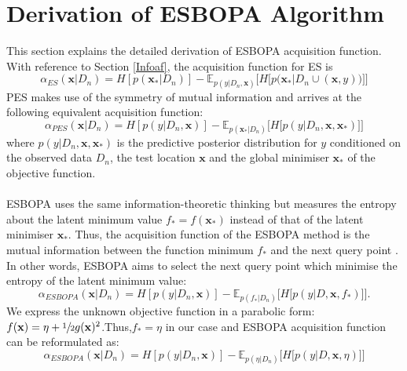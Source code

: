 \documentclass[a4paper,11pt]{report}
\begin{document}
\section{Derivation of ESBOPA Algorithm}
This section explains the detailed derivation of ESBOPA acquisition function. With reference to Section \ref{Infoaf}, the acquisition function for ES is
	\begin{equation}
	\alpha_{ES} (\mathbf{x} \vert D_n )=H[p(\mathbf{x}_{*} \vert D_n)]-\mathbb{E} _{p(y \vert D_n,\mathbf{x})}\Big[H \big[p \big(\mathbf{x}_{*} \vert D_n \cup {(\mathbf{x},y)} \big) \big] \Big]
	\end{equation}
PES makes use of the symmetry of mutual information and arrives at the following equivalent acquisition function:			 	 
	\begin{equation} 
	\alpha_{PES} (\mathbf{x} \vert D_n )=H[p(y \vert D_n,\mathbf{x})]-\mathbb{E} _{p(\mathbf{x}_{*} \vert D_n)}\Big[H \big[p(y \vert D_n,\mathbf{x},\mathbf{x}_{*}) \big] \Big]
	\end{equation}
where $p(y \vert D_n, \mathbf{x}, \mathbf{x}_{*})$ is the predictive posterior distribution for $y$ conditioned on the observed data $D_n$, the test location $\mathbf{x}$ and the global minimiser $ \mathbf{x}_{*}$ of the objective function.       
\\\\ 
ESBOPA uses the same information-theoretic thinking but measures the entropy about the latent minimum value $f_{*}=f(\mathbf{x}_{*})$ instead of that of the latent minimiser $\mathbf{x}_{*}$. Thus, the acquisition function of the ESBOPA method is the mutual information between the function minimum $f_{*}$ and the next query point \cite{wang2017max}. In other words, ESBOPA aims to select the next query point which minimise the entropy of the latent minimum value: 
	\begin{equation}
	\alpha_{ESBOPA}(\mathbf{x} \vert D_n ) = H[p(y \vert D_n,\mathbf{x})]- \mathbb{E} _{p(f_{*} \vert D_n)}\Big[H \big[p(y \vert D,\mathbf{x},f_{*})\big]\Big]. 
	\end{equation}        
We express the unknown objective function in a parabolic form: $f(\mathbf{x}) =\eta+\sfrac{1}{2}g(\mathbf{x})^2$.Thus,$f_{*} = \eta $ in our case and ESBOPA acquisition function can be reformulated as: 
   	\begin{equation}
	\alpha_{ESBOPA}(\mathbf{x} \vert D_n ) = H[p(y \vert D_n,\mathbf{x})]- \mathbb{E} _{p(\eta \vert D_n)}\Big[H \big[p(y \vert D,\mathbf{x},\eta) \big] \Big] 
	\end{equation}  
\end{document}
